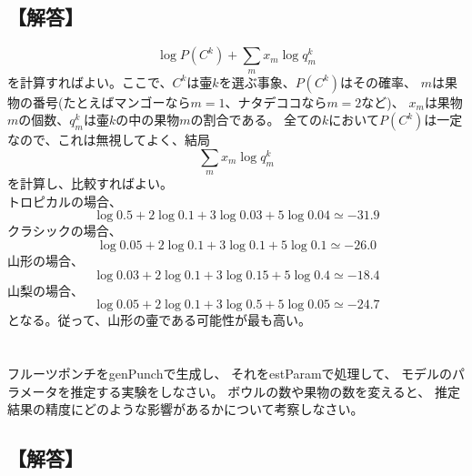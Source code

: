 \documentclass[a4j]{jarticle}
\begin{document}
\subsection{【解答】}
\begin{equation}
\log P(C^k) + \sum_{m}x_m\log q_m^k
\end{equation}
を計算すればよい。ここで、$C^k$は壷$k$を選ぶ事象、$P(C^k)$はその確率、
$m$は果物の番号(たとえばマンゴーなら$m=1$、ナタデココなら$m=2$など)、
$x_m$は果物$m$の個数、$q_m^k$は壷$k$の中の果物$m$の割合である。
全ての$k$において$P(C^k)$は一定なので、これは無視してよく、結局
\begin{equation}
\sum_{m}x_m\log q_m^k
\end{equation}
を計算し、比較すればよい。\\
トロピカルの場合、
\begin{equation}
\log 0.5 + 2\log 0.1 + 3\log 0.03 + 5\log 0.04 \simeq -31.9
\end{equation}
クラシックの場合、
\begin{equation}
\log 0.05 + 2\log 0.1 + 3\log 0.1 + 5\log 0.1 \simeq -26.0
\end{equation}
山形の場合、
\begin{equation}
\log 0.03 + 2\log 0.1 + 3\log 0.15 + 5\log 0.4 \simeq -18.4
\end{equation}
山梨の場合、
\begin{equation}
\log 0.05 + 2\log 0.1 + 3\log 0.5 + 5\log 0.05 \simeq -24.7
\end{equation}
となる。従って、山形の壷である可能性が最も高い。

\section{}
フルーツポンチをgenPunchで生成し、
それをestParamで処理して、
モデルのパラメータを推定する実験をしなさい。
ボウルの数や果物の数を変えると、
推定結果の精度にどのような影響があるかについて考察しなさい。

\subsection{【解答】}
\end{document}
